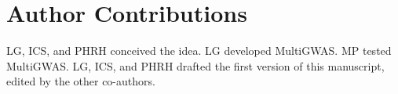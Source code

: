 \documentclass{article}
\begin{document}
\section{Author Contributions}
LG, ICS, and PHRH conceived the idea. LG developed MultiGWAS. MP tested MultiGWAS. LG, ICS, and PHRH drafted the first version of this manuscript, edited by the other co-authors.


%
%

\printbibliography
%
%
\end{document}
